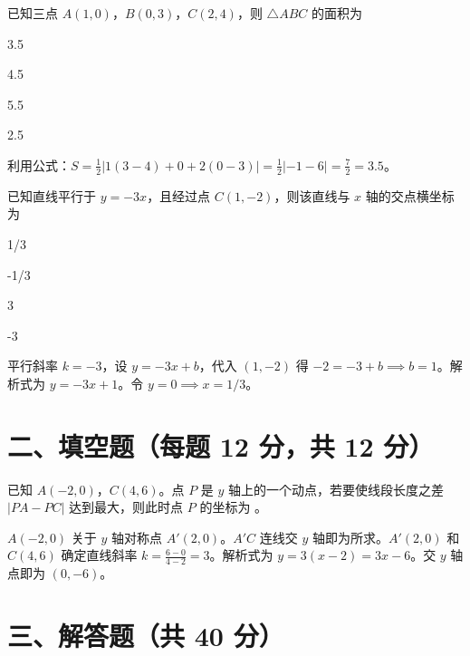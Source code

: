 \documentclass{exam-zh}
\begin{document}
\begin{question}[points=12]
  已知三点 $A(1, 0)$，$B(0, 3)$，$C(2, 4)$，则 $\triangle ABC$ 的面积为
  \begin{choices}
    \item 3.5
    \item 4.5
    \item 5.5
    \item 2.5
  \end{choices}
  \paren[A]
  \begin{solutionblock}
    利用公式：$S = \frac{1}{2}|1(3 - 4) + 0 + 2(0 - 3)| = \frac{1}{2}|-1 - 6| = \frac{7}{2} = 3.5$。
  \end{solutionblock}
\end{question}



\begin{question}[points=12]
  已知直线平行于 $y = -3x$，且经过点 $C(1, -2)$，则该直线与 $x$ 轴的交点横坐标为
  \begin{choices}
    \item 1/3
    \item -1/3
    \item 3
    \item -3
  \end{choices}
  \paren[A]
  \begin{solutionblock}
    平行斜率 $k = -3$，设 $y = -3x + b$，代入 $(1,-2)$ 得 $-2 = -3 + b \implies b = 1$。解析式为 $y = -3x + 1$。令 $y=0 \implies x = 1/3$。
  \end{solutionblock}
\end{question}


\section*{二、填空题（每题 12 分，共 12 分）}


\begin{question}[points=12]
  已知 $A(-2, 0)$，$C(4, 6)$。点 $P$ 是 $y$ 轴上的一个动点，若要使线段长度之差 $|PA - PC|$ 达到最大，则此时点 $P$ 的坐标为 \fillin。
  \paren[$(0, -6)$]
  \begin{solutionblock}
    $A(-2, 0)$ 关于 $y$ 轴对称点 $A'(2, 0)$。$A'C$ 连线交 $y$ 轴即为所求。$A'(2,0)$ 和 $C(4,6)$ 确定直线斜率 $k = \frac{6-0}{4-2} = 3$。解析式为 $y = 3(x-2) = 3x - 6$。交 $y$ 轴点即为 $(0, -6)$。
  \end{solutionblock}
\end{question}


\section*{三、解答题（共 40 分）}
\end{document}
